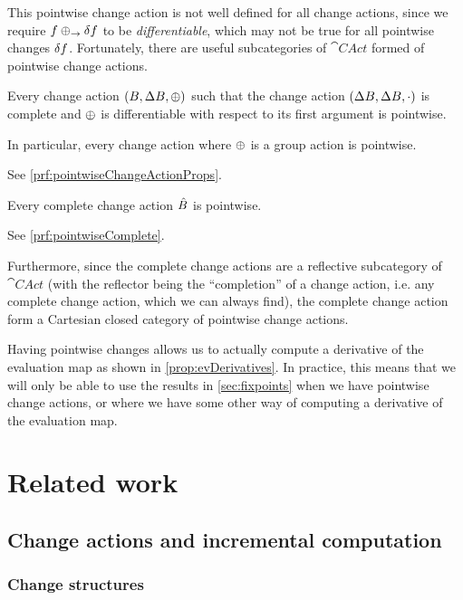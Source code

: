 This pointwise change action is not well defined for all change actions, since
we require $f \oplus_\rightarrow \delta f$ to be \emph{differentiable}, which
may not be true for all pointwise changes $\delta f$.
Fortunately, there are useful subcategories of $\cat{CAct}$ formed of pointwise change actions.

\begin{prop}[name=Pointwise change actions, restate=pointwiseChangeActionProps]
  \label{prop:pointwiseChangeActionProps}
  Every change action $(B,\Delta B,\oplus)$ such that the change action
  $(\Delta B,\Delta B,\cdot)$ is complete and $\oplus$ is differentiable with
  respect to its first argument is pointwise.

  In particular, every change action where $\oplus$ is a group action is pointwise.
\end{prop}
\ifproofs
  See \cref{prf:pointwiseChangeActionProps}.
\fi

\begin{prop}[name=Complete implies pointwise, restate=pointwiseComplete]
  \label{prop:pointwiseComplete}
   Every complete change action $\hat{B}$ is pointwise.
\end{prop}
\ifproofs
  See \cref{prf:pointwiseComplete}.
\fi

Furthermore, since the complete change actions are a reflective subcategory of
$\cat{CAct}$ (with the reflector being the ``completion'' of a change action,
i.e. any complete change action, which we can always find), the complete change
action form a Cartesian closed category of pointwise change actions.

Having pointwise changes allows us to actually compute a derivative of the
evaluation map as shown in \cref{prop:evDerivatives}. In practice, this means
that we will only be able to use the results in \cref{sec:fixpoints} when
we have pointwise change actions, or where we have some other way of computing
a derivative of the evaluation map.

\section{Related work}

\subsection{Change actions and incremental computation}

\subsubsection{Change structures}
\label{sec:relatedChangeStructures}

